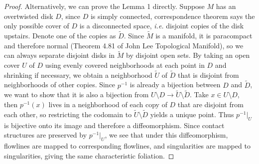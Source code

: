 \documentclass[12pt]{article}
\begin{document}
\begin{problem}[4]
\begin{proof}
Alternatively, we can prove the Lemma 1 directly. Suppose $ M$ has an overtwisted disk  $ D$, since  $ D$ is simply connected, correspondence theorem says the only possible cover of $ D$ is a disconnected space, \emph{i.e.} disjoint copies of the disk upstairs. Denote one of the copies as $ \widetilde{ D}$. Since $ \widetilde{ M}$ is a manifold, it is paracompact and therefore normal (Theorem 4.81 of John Lee Topological Manifold), so we can always separate disjoint disks in $ \widetilde{ M}$ by disjoint open sets. By taking an open cover $ U$ of $D$ using evenly covered  neighborhoods at each point in $ D$ and shrinking if necessary, we obtain a neighborhood $ \widetilde{ U}$ of $ \widetilde{ D}$ that is disjoint from neighborhoods of other copies. Since $ p^{-1}$ is already a bijection between $ D$ and  $ \widetilde{ D}$, we want to show that it is also a bijection from $ U\setminus D \to \widetilde{ U} \setminus \widetilde{ D}$. Take $ x \in U \setminus D$, then $ p^{-1}(x)$ lives in a neighborhood of each copy of $ D$ that are disjoint from each other, so restricting the codomain to $ \widetilde{ U} \setminus \widetilde{ D}$ yields a unique point. Thus $ p^{-1}|_{U}$ is bijective onto its image and therefore a diffeomorphism. Since contact structures are preserved by $ p^{-1}|_{U}$, we see that under this diffeomorphism, flowlines are mapped to corresponding flowlines, and singularities are mapped to singularities, giving the same characteristic foliation. 
\end{proof}
\end{problem}
\end{document}
